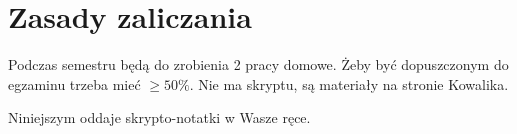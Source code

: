 \section{Zasady zaliczania}

Podczas semestru będą do zrobienia 2 pracy domowe. Żeby być dopuszczonym do egzaminu trzeba mieć $\ge 50\%$. Nie ma skryptu, są materiały na stronie Kowalika.

Niniejszym oddaje skrypto-notatki w Wasze ręce.
\clearpage